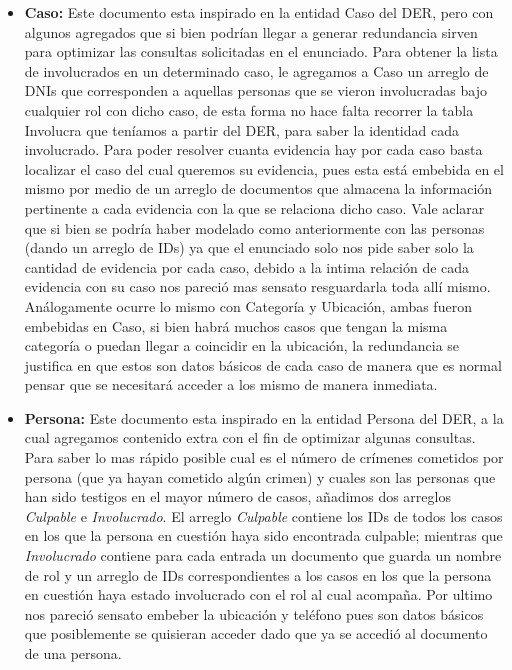 \documentclass{article}
\theoremstyle{definition}
\theoremstyle{remark}
\begin{document}
\begin{itemize}

\item \textbf{Caso:} Este documento esta inspirado en la entidad Caso del DER, pero con algunos agregados que si bien podrían llegar a generar redundancia sirven para optimizar las consultas solicitadas en el enunciado. Para obtener la lista de involucrados en un determinado caso, le agregamos a Caso un arreglo de DNIs que corresponden a aquellas personas que se vieron involucradas bajo cualquier rol con dicho caso, de esta forma no hace falta recorrer la tabla Involucra que teníamos a partir del DER, para saber la identidad cada involucrado. Para poder resolver cuanta evidencia hay por cada caso basta localizar el caso del cual queremos su evidencia, pues esta está embebida en el mismo por medio de un arreglo de documentos que almacena la información pertinente a cada evidencia con la que se relaciona dicho caso. Vale aclarar que si bien se podría haber modelado como anteriormente con las personas (dando un arreglo de IDs) ya que el enunciado solo nos pide saber solo la cantidad de evidencia por cada caso, debido a la intima relación de cada evidencia con su caso nos pareció mas sensato resguardarla toda allí mismo. Análogamente ocurre lo mismo con Categoría y Ubicación, ambas fueron embebidas en Caso, si bien habrá muchos casos que tengan la misma categoría o puedan llegar a coincidir en la ubicación, la redundancia se justifica en que estos son datos básicos de cada caso de manera que es normal pensar que se necesitará acceder a los mismo de manera inmediata.

\item \textbf{Persona:} Este documento esta inspirado en la entidad Persona del DER, a la cual agregamos contenido extra con el fin de optimizar algunas consultas. Para saber lo mas rápido posible cual es el número de crímenes cometidos por persona (que ya hayan cometido algún crimen) y cuales son las personas que han sido testigos en el mayor número de casos, añadimos dos arreglos \textit{Culpable} e \textit{Involucrado}. El arreglo \textit{Culpable} contiene los IDs de todos los casos en los que la persona en cuestión haya sido encontrada culpable; mientras que \textit{Involucrado} contiene para cada entrada un documento que guarda un nombre de rol y un arreglo de IDs correspondientes a los casos en los que la persona en cuestión haya estado involucrado con el rol al cual acompaña. Por ultimo nos pareció sensato embeber la ubicación y teléfono pues son datos básicos que posiblemente se quisieran acceder dado que ya se accedió al documento de una persona.


\end{itemize}
\end{document}
